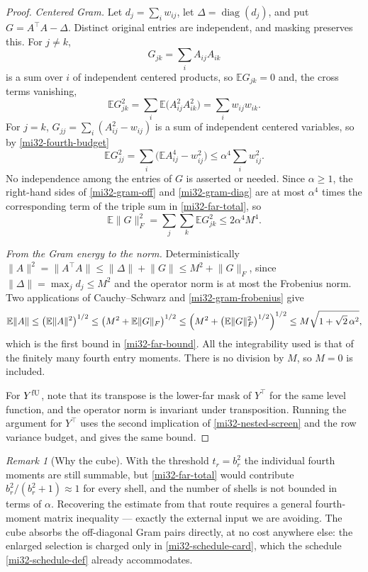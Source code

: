\documentclass[11pt]{article}
\theoremstyle{definition}
\theoremstyle{remark}
\newtheorem{remark}[theorem]{Remark}
\newcommand{\E}{\mathbb E}
\newcommand{\norm}[1]{\lVert#1\rVert}
\newcommand{\diag}{\operatorname{diag}}
\begin{document}
\begin{proof}
\emph{Centered Gram.} Let $d_j=\sum_iw_{ij}$, let
$\Delta=\diag(d_j)$, and put $G=A^\top A-\Delta$. Distinct original
entries are independent, and masking preserves this. For $j\ne k$,
\[
 G_{jk}=\sum_iA_{ij}A_{ik}
\]
is a sum over $i$ of independent centered products, so $\E G_{jk}=0$
and, the cross terms vanishing,
\begin{equation}\label{mi32-gram-off}
 \E G_{jk}^2=\sum_i\E\bigl(A_{ij}^2A_{ik}^2\bigr)
            =\sum_iw_{ij}w_{ik}.
\end{equation}
For $j=k$, $G_{jj}=\sum_i(A_{ij}^2-w_{ij})$ is a sum of independent
centered variables, so by \eqref{mi32-fourth-budget}
\begin{equation}\label{mi32-gram-diag}
 \E G_{jj}^2=\sum_i\bigl(\E A_{ij}^4-w_{ij}^2\bigr)
    \le\alpha^4\sum_iw_{ij}^2 .
\end{equation}
No independence among the entries of $G$ is asserted or needed. Since
$\alpha\ge1$, the right-hand sides of \eqref{mi32-gram-off} and
\eqref{mi32-gram-diag} are at most $\alpha^4$ times the corresponding
term of the triple sum in \eqref{mi32-far-total}, so
\begin{equation}\label{mi32-gram-frobenius}
 \E\norm{G}_F^2=\sum_j\sum_k\E G_{jk}^2\le2\alpha^4M^4 .
\end{equation}

\emph{From the Gram energy to the norm.} Deterministically
$\norm{A}^2=\norm{A^\top A}\le\norm{\Delta}+\norm{G}
 \le M^2+\norm{G}_F$, since
$\norm{\Delta}=\max_jd_j\le M^2$ and the operator norm is at most the
Frobenius norm. Two applications of Cauchy--Schwarz and
\eqref{mi32-gram-frobenius} give
\[
 \E\norm{A}\le\bigl(\E\norm{A}^2\bigr)^{1/2}
  \le\bigl(M^2+\E\norm{G}_F\bigr)^{1/2}
  \le\Bigl(M^2+\bigl(\E\norm{G}_F^2\bigr)^{1/2}\Bigr)^{1/2}
  \le M\sqrt{1+\sqrt2\,\alpha^2},
\]
which is the first bound in \eqref{mi32-far-bound}. All the
integrability used is that of the finitely many fourth entry moments.
There is no division by $M$, so $M=0$ is included.

For $Y^{\rm fU}$, note that its transpose is the lower-far mask of
$Y^\top$ for the same level function, and the operator norm is
invariant under transposition. Running the argument for $Y^\top$ uses
the second implication of \eqref{mi32-nested-screen} and the row
variance budget, and gives the same bound.
\end{proof}

\begin{remark}[Why the cube]
\label{mi32-cube-remark}
With the threshold $t_r=b_r^2$ the individual fourth moments are still
summable, but \eqref{mi32-far-total} would contribute
$b_r^2/(b_r^2+1)\approx1$ for every shell, and the number of shells is
not bounded in terms of $\alpha$. Recovering the estimate from that
route requires a general fourth-moment matrix inequality --- exactly the
external input we are avoiding. The cube absorbs the off-diagonal Gram
pairs directly, at no cost anywhere else: the enlarged selection is
charged only in \eqref{mi32-schedule-card}, which the schedule
\eqref{mi32-schedule-def} already accommodates.
\end{remark}
\end{document}
